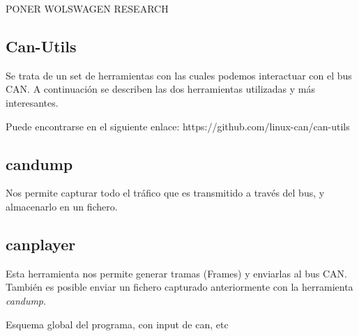 PONER WOLSWAGEN RESEARCH

\subsection{Can-Utils}\label{can-utils}

Se trata de un set de herramientas con las cuales podemos interactuar con el bus CAN. A continuación se describen las dos herramientas utilizadas y más interesantes.

Puede encontrarse en el siguiente enlace: https://github.com/linux-can/can-utils

\subsection{candump}\label{candump}

Nos permite capturar todo el tráfico que es transmitido a través del bus, y almacenarlo en un fichero.

\subsection{canplayer}\label{canplayer}

Esta herramienta nos permite generar tramas (Frames) y enviarlas al bus CAN. También es posible enviar un fichero capturado anteriormente con la herramienta \emph{candump}.





Esquema global del programa, con input de can, etc


